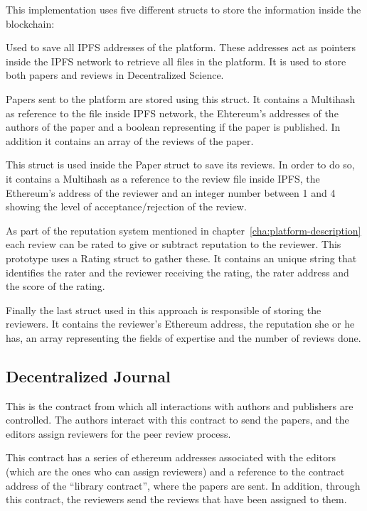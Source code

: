 This implementation uses five different structs to store the information inside
the blockchain:

\begin{itemize}
   Used to save all IPFS addresses of the platform.
  These addresses act as pointers inside the IPFS network to retrieve all files
  in the platform. It is used to store both papers and reviews in Decentralized
  Science.

   Papers sent to the platform are stored using this struct.
  It contains a Multihash as reference to the file inside IPFS network, the
  Ehtereum's addresses of the authors of the paper and a boolean representing if
  the paper is published. In addition it contains an array of the reviews of the
  paper.

   This struct is used inside the Paper struct to save its
  reviews. In order to do so, it contains a Multihash as a reference to the
  review file inside IPFS, the Ethereum's address of the reviewer and an integer
  number between 1 and 4 showing the level of acceptance/rejection of the
  review.

   As part of the reputation system mentioned in
  chapter~\ref{cha:platform-description} each review can be rated to give or
  subtract reputation to the reviewer. This prototype uses a Rating struct to
  gather these. It contains an unique string that identifies the rater
  and the reviewer receiving the rating, the rater address and the score of the
  rating.

   Finally the last struct used in this approach is responsible
  of storing the reviewers. It contains the reviewer's Ethereum address, the
  reputation she or he has, an array representing the fields of expertise and
  the number of reviews done. 
\end{itemize}

\subsection*{Decentralized Journal}%
\label{sec:decentr-journ}

This is the contract from which all interactions with authors and publishers are
controlled. The authors interact with this contract to send the papers, and the
editors assign reviewers for the peer review process.

This contract has a series of ethereum addresses associated with the editors
(which are the ones who can assign reviewers) and a reference to the contract
address of the ``library contract'', where the papers are sent. In addition,
through this contract, the reviewers send the reviews that have been assigned to
them.

